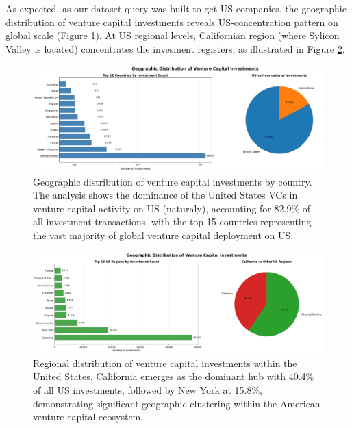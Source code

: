 As expected, as our dataset query was built to get US companies, the geographic distribution of venture capital investments reveals US-concentration pattern on global scale (Figure \ref{fig:geographic_distribution_country}). At US regional levels, Californian region (where Sylicon Valley is located) concentrates the invesment registers, as illustrated in Figure \ref{fig:geographic_distribution_region}.

\begin{figure}[htbp]
\centering
\includegraphics[width=1\textwidth]{../figures/us/geographic_distribution_country_analysis.png}
\caption{Geographic distribution of venture capital investments by country. The analysis shows the dominance of the United States VCs in venture capital activity on US (naturaly), accounting for 82.9\% of all investment transactions, with the top 15 countries representing the vast majority of global venture capital deployment on US.}
\label{fig:geographic_distribution_country}
\end{figure}

\begin{figure}[htbp]
\centering
\includegraphics[width=1\textwidth]{../figures/us/geographic_distribution_region_analysis.png}
\caption{Regional distribution of venture capital investments within the United States. California emerges as the dominant hub with 40.4\% of all US investments, followed by New York at 15.8\%, demonstrating significant geographic clustering within the American venture capital ecosystem.}
\label{fig:geographic_distribution_region}
\end{figure}

